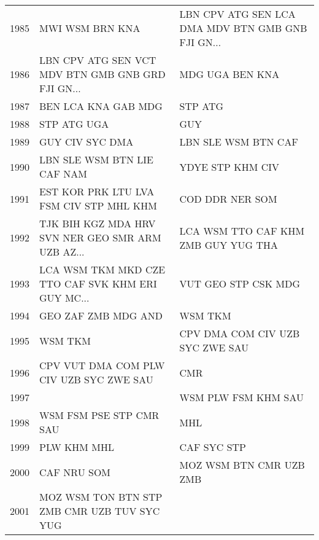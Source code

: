 \begin{table}[ht!]
{\begin{tabular}{rll}
        1985 &                                    MWI WSM BRN KNA &  LBN CPV ATG SEN LCA DMA MDV BTN GMB GNB FJI GN... \\
        1986 &  LBN CPV ATG SEN VCT MDV BTN GMB GNB GRD FJI GN... &                                    MDG UGA BEN KNA \\
        1987 &                                BEN LCA KNA GAB MDG &                                            STP ATG \\
        1988 &                                        STP ATG UGA &                                                GUY \\
        1989 &                                    GUY CIV SYC DMA &                                LBN SLE WSM BTN CAF \\
        1990 &                        LBN SLE WSM BTN LIE CAF NAM &                                   YDYE STP KHM CIV \\
        1991 &            EST KOR PRK LTU LVA FSM CIV STP MHL KHM &                                    COD DDR NER SOM \\
        1992 &  TJK BIH KGZ MDA HRV SVN NER GEO SMR ARM UZB AZ... &                LCA WSM TTO CAF KHM ZMB GUY YUG THA \\
        1993 &  LCA WSM TKM MKD CZE TTO CAF SVK KHM ERI GUY MC... &                                VUT GEO STP CSK MDG \\
        1994 &                                GEO ZAF ZMB MDG AND &                                            WSM TKM \\
        1995 &                                            WSM TKM &                    CPV DMA COM CIV UZB SYC ZWE SAU \\
        1996 &            CPV VUT DMA COM PLW CIV UZB SYC ZWE SAU &                                                CMR \\
        1997 &                                                    &                                WSM PLW FSM KHM SAU \\
        1998 &                            WSM FSM PSE STP CMR SAU &                                                MHL \\
        1999 &                                        PLW KHM MHL &                                        CAF SYC STP \\
        2000 &                                        CAF NRU SOM &                            MOZ WSM BTN CMR UZB ZMB \\
        2001 &        MOZ WSM TON BTN STP ZMB CMR UZB TUV SYC YUG &                                                    \\

\end{tabular}}
\end{table}
